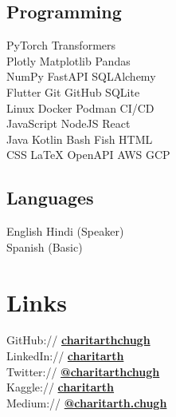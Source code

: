 \documentclass[]{resume-template}
\begin{document}
\begin{minipage}[t]{0.33\textwidth}
    \subsection{Programming}\label{subsec:programming}
    PyTorch \textbullet{} Transformers \textbullet{} \\
    Plotly \textbullet{} Matplotlib \textbullet{} Pandas \textbullet{}\\
    NumPy \textbullet{} FastAPI \textbullet SQLAlchemy \\
    Flutter \textbullet{} Git \textbullet{} GitHub \textbullet{} SQLite \textbullet{}\\
    Linux \textbullet Docker \textbullet Podman \textbullet {} CI/CD \\
    JavaScript \textbullet{} NodeJS \textbullet{} React \\
    Java \textbullet{} Kotlin \textbullet{} Bash \textbullet{} Fish \textbullet{} HTML \textbullet{}\\
    CSS \textbullet{} \LaTeX \textbullet{} OpenAPI \textbullet{} AWS \textbullet{} GCP
    \vspace{\topsep}
    \subsection{Languages}
    English \textbullet{} Hindi (Speaker)\\
    Spanish (Basic)


    \section{Links}\label{sec:links}
    GitHub:// \href{https://github.com/charitarthchugh}{\textbf {charitarthchugh}} \\
    LinkedIn:// \href{https:///www.linkedin.com/in/charitarth}{\textbf {charitarth}} \\
    Twitter:// \href{https://twitter.com/charitarthchugh}{\textbf{@charitarthchugh}}\\
    Kaggle:// \href{https://kaggle.com/charitarth}{\textbf{charitarth}}\\
    Medium:// \href{https://medium.com/@charitarth.chugh}{\textbf{@charitarth.chugh}}\\

\end{minipage}
\end{document}
